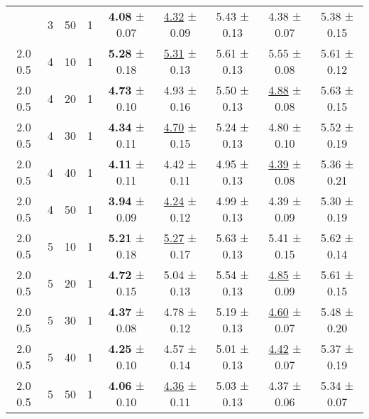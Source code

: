 \begin{tabular}{ccccccccc}
\begin{tabular}{lllllllll}
2.0 0.5 & 3 & 50 & 1 & \textbf{4.08} ± 0.07 & \underline{4.32} ± 0.09 & 5.43 ± 0.13 &             4.38 ± 0.07 & 5.38 ± 0.15 \\
2.0 0.5 & 4 & 10 & 1 & \textbf{5.28} ± 0.18 & \underline{5.31} ± 0.13 & 5.61 ± 0.13 &             5.55 ± 0.08 & 5.61 ± 0.12 \\
2.0 0.5 & 4 & 20 & 1 & \textbf{4.73} ± 0.10 &             4.93 ± 0.16 & 5.50 ± 0.13 & \underline{4.88} ± 0.08 & 5.63 ± 0.15 \\
2.0 0.5 & 4 & 30 & 1 & \textbf{4.34} ± 0.11 & \underline{4.70} ± 0.15 & 5.24 ± 0.13 &             4.80 ± 0.10 & 5.52 ± 0.19 \\
2.0 0.5 & 4 & 40 & 1 & \textbf{4.11} ± 0.11 &             4.42 ± 0.11 & 4.95 ± 0.13 & \underline{4.39} ± 0.08 & 5.36 ± 0.21 \\
2.0 0.5 & 4 & 50 & 1 & \textbf{3.94} ± 0.09 & \underline{4.24} ± 0.12 & 4.99 ± 0.13 &             4.39 ± 0.09 & 5.30 ± 0.19 \\
2.0 0.5 & 5 & 10 & 1 & \textbf{5.21} ± 0.18 & \underline{5.27} ± 0.17 & 5.63 ± 0.13 &             5.41 ± 0.15 & 5.62 ± 0.14 \\
2.0 0.5 & 5 & 20 & 1 & \textbf{4.72} ± 0.15 &             5.04 ± 0.13 & 5.54 ± 0.13 & \underline{4.85} ± 0.09 & 5.61 ± 0.15 \\
2.0 0.5 & 5 & 30 & 1 & \textbf{4.37} ± 0.08 &             4.78 ± 0.12 & 5.19 ± 0.13 & \underline{4.60} ± 0.07 & 5.48 ± 0.20 \\
2.0 0.5 & 5 & 40 & 1 & \textbf{4.25} ± 0.10 &             4.57 ± 0.14 & 5.01 ± 0.13 & \underline{4.42} ± 0.07 & 5.37 ± 0.19 \\
2.0 0.5 & 5 & 50 & 1 & \textbf{4.06} ± 0.10 & \underline{4.36} ± 0.11 & 5.03 ± 0.13 &             4.37 ± 0.06 & 5.34 ± 0.07 \\
\bottomrule
\end{tabular}
